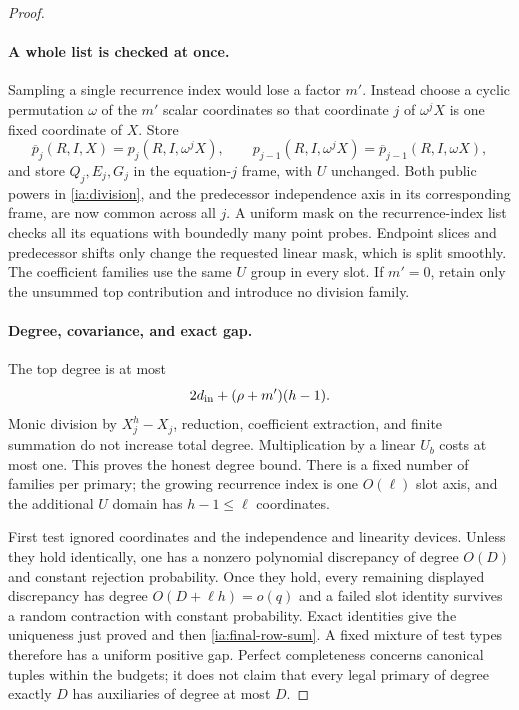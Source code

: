 \begin{proof}
\paragraph{A whole list is checked at once.}
Sampling a single recurrence index would lose a factor $m'$.  Instead
choose a cyclic permutation $\omega$ of the $m'$ scalar coordinates
so that coordinate $j$ of $\omega^jX$ is one fixed coordinate of $X$.
Store
\begin{equation}
 \overline p_j(R,I,X)=p_j(R,I,\omega^jX),
 \qquad
 p_{j-1}(R,I,\omega^jX)
      =\overline p_{j-1}(R,I,\omega X),             \label{ia:recurrence-frames}
\end{equation}
and store $Q_j,E_j,G_j$ in the equation-$j$ frame, with $U$ unchanged.
Both public powers in \eqref{ia:division}, and the predecessor
independence axis in its corresponding frame, are now common across
all $j$.  A uniform mask on the recurrence-index list checks all its
equations with boundedly many point probes.  Endpoint slices and
predecessor shifts only change the requested linear mask, which is
split smoothly.  The coefficient families use the same $U$ group in
every slot.  If $m'=0$, retain only the unsummed top contribution and
introduce no division family.

\paragraph{Degree, covariance, and exact gap.}
The top degree is at most
\begin{equation}
 2d_{\rm in}+(\rho+m')(h-1).                       \label{ia:tool-degree}
\end{equation}
Monic division by $X_j^h-X_j$, reduction, coefficient extraction, and
finite summation do not increase total degree.  Multiplication by a
linear $U_b$ costs at most one.  This proves the honest degree bound.
There is a fixed number of families per primary; the growing recurrence
index is one $O(\ell)$ slot axis, and the additional $U$ domain has
$h-1\le\ell$ coordinates.

First test ignored coordinates and the independence and linearity
devices.  Unless they hold identically, one has a nonzero polynomial
discrepancy of degree $O(D)$ and constant rejection probability.
Once they hold, every remaining displayed discrepancy has degree
$O(D+\ell h)=o(q)$ and a failed slot identity survives a random
contraction with constant probability.  Exact identities give the
uniqueness just proved and then \eqref{ia:final-row-sum}.  A fixed
mixture of test types therefore has a uniform positive gap.  Perfect
completeness concerns canonical tuples within the budgets; it does not
claim that every legal primary of degree exactly $D$ has auxiliaries
of degree at most $D$.


\end{proof}
